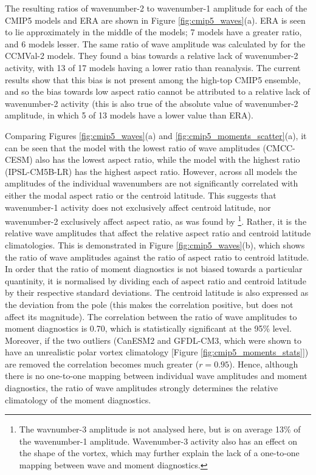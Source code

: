 The resulting ratios of wavenumber-2 to wavenumber-1 amplitude for each of the
CMIP5 models and ERA are shown in Figure \ref{fig:cmip5_waves}(a). ERA is seen
to lie approximately in the middle of the models; 7 models have a greater ratio,
and 6 models lesser. The same ratio of wave amplitude was calculated by
\citet{Butchart2011} for the CCMVal-2 models. They found a bias towards a
relative lack of wavenumber-2 activity, with 13 of 17 models having a lower
ratio than reanalysis. The current results show that this bias is not present
among the high-top CMIP5 ensemble, and so the bias towards low aspect ratio
cannot be attributed to a relative lack of wavenumber-2 activity (this is also
true of the absolute value of wavenumber-2 amplitude, in which 5 of 13 models
have a lower value than ERA).

Comparing Figures \ref{fig:cmip5_waves}(a) and
\ref{fig:cmip5_moments_scatter}(a), it can be seen that the model with the
lowest ratio of wave amplitudes (CMCC-CESM) also has the lowest aspect ratio,
while the model with the highest ratio (IPSL-CM5B-LR) has the highest aspect
ratio. However, across all models the amplitudes of the individual wavenumbers
are not significantly correlated with either the modal aspect ratio or the
centroid latitude. This suggests that wavenumber-1 activity does not exclusively
affect centroid latitude, nor wavenumber-2 exclusively affect aspect ratio, as
was found by \citet{Waugh1997}\footnote{The wavnumber-3 amplitude is not
  analysed here, but is on average 13\% of the wavenumber-1
  amplitude. Wavenumber-3 activity also has an effect on the shape of the
  vortex, which may further explain the lack of a one-to-one mapping between
  wave and moment diagnostics.}. Rather, it is the relative wave amplitudes that
affect the relative aspect ratio and centroid latitude climatologies. This is
demonstrated in Figure \ref{fig:cmip5_waves}(b), which shows the ratio of wave
amplitudes against the ratio of aspect ratio to centroid latitude. In order that
the ratio of moment diagnostics is not biased towards a particular quantinity,
it is normalised by dividing each of aspect ratio and centroid latitude by their
respective standard deviations. The centroid latitude is also expressed as the
deviation from the pole (this makes the correlation positive, but does not
affect its magnitude). The correlation between the ratio of wave amplitudes to
moment diagnostics is 0.70, which is statistically significant at the 95\%
level. Moreover, if the two outliers (CanESM2 and GFDL-CM3, which were shown to
have an unrealistic polar vortex climatology [Figure
\ref{fig:cmip5_moments_stats}]) are removed the correlation becomes much greater
($r=0.95$). Hence, although there is no one-to-one mapping between individual
wave amplitudes and moment diagnostics, the ratio of wave amplitudes strongly
determines the relative climatology of the moment diagnostics.



